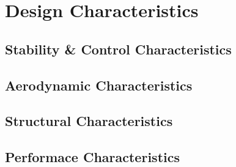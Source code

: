 \chapter{Design Characteristics}
\setlength{\parindent}{15pt}
\label{ch:desi_char}

\section{Stability \& Control Characteristics}
\label{sec:stab_cont_char}

\section{Aerodynamic Characteristics}
\label{sec:aero_char}

\section{Structural Characteristics}
\label{sec:stru_char}

\section{Performace Characteristics}
\label{sec:perf_char}